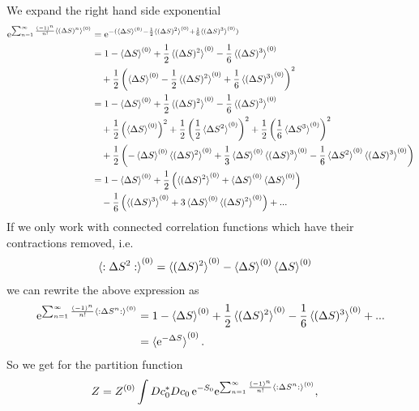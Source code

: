\documentclass[12pt,a4paper]{scrartcl}
\numberwithin{equation}{section}
\begin{document}
We expand the right hand side exponential
\begin{align}
 \mathrm{e}^{ \sum_{n=1}^{\infty} \frac{(-1)^n}{n!} \braket{ (\Delta S)^n }^{(0)}} 
 &= \mathrm{e}^{ -(\braket{ \Delta S}^{(0)} - \frac{1}{2} \braket{ (\Delta S)^2}^{(0)} +\frac{1}{6} \braket{ (\Delta S)^3}^{(0)})  } \\
 &= 1 -  \braket{ \Delta S}^{(0)} + \frac{1}{2} \braket{ (\Delta S)^2}^{(0)} -\frac{1}{6} \braket{ (\Delta S)^3}^{(0)} \nonumber \\
 &\ \ \   + \frac{1}{2} \left( \braket{ \Delta S}^{(0)} - \frac{1}{2} \braket{ (\Delta S)^2}^{(0)}  +\frac{1}{6} \braket{ (\Delta S)^3}^{(0)}  \right)^2 \\
%      
&= 1 -  \braket{ \Delta S}^{(0)} + \frac{1}{2} \braket{ (\Delta S)^2}^{(0)}-\frac{1}{6} \braket{ (\Delta S)^3}^{(0)} \nonumber \\
     &\ \ \  + \frac{1}{2} \left( \braket{ \Delta S}^{(0)}\right)^2+ \frac{1}{2} \left(\frac{1}{2} \braket{ \Delta S^2}^{(0)}\right)^2 
     + \frac{1}{2} \left(\frac{1}{6} \braket{ \Delta S^3}^{(0)}\right)^2 \nonumber \\
     &\ \ \ +\frac{1}{2}\left( - \braket{ \Delta S}^{(0)}   \braket{ (\Delta S)^2}^{(0)}
                   + \frac{1}{3}\braket{ \Delta S}^{(0)}   \braket{ (\Delta S)^3}^{(0)} 
                   - \frac{1}{6}\braket{ \Delta S^2}^{(0)}   \braket{ (\Delta S)^3}^{(0)} 
            \right) \\
%
&= 1 -  \braket{ \Delta S}^{(0)} +\frac{1}{2} \left( \braket{ (\Delta S)^2}^{(0)} + \braket{ \Delta S}^{(0)}\braket{ \Delta S}^{(0)} \right) \nonumber\\
&\ \ \  -\frac{1}{6} \left( \braket{ (\Delta S)^3}^{(0)} + 3\braket{ \Delta S}^{(0)}   \braket{ (\Delta S)^2}^{(0)} \right) + ...
\end{align}
If we only work with connected correlation functions which have their contractions removed, i.e. 
\begin{align}
 \braket{: \Delta S^2 : }^{(0)} &= \braket{ (\Delta S)^2}^{(0)} - \braket{ \Delta S}^{(0)}\braket{ \Delta S}^{(0)} 
 \end{align}
we can rewrite the above expression as 
\begin{align}
 \mathrm{e}^{ \sum_{n=1}^{\infty} \frac{(-1)^n}{n!} \braket{:\Delta S^n :}^{(0)}} 
 &= 1 -  \braket{ \Delta S}^{(0)} +\frac{1}{2} \braket{ (\Delta S)^2}^{(0)} 
    -\frac{1}{6}  \braket{ (\Delta S)^3}^{(0)}  + ... \\
 &=\braket{ \mathrm{e}^{-\Delta S} }^{(0)}.
\end{align}
So we get for the partition function
\begin{align}
 Z 
 &=Z^{(0)}\int  Dc^*_0Dc_0 \, \mathrm{e}^{-S_0} \mathrm{e}^{ \sum_{n=1}^{\infty} \frac{(-1)^n}{n!} \braket{:\Delta S^n :}^{(0)}}  ,
\end{align}
\end{document}
